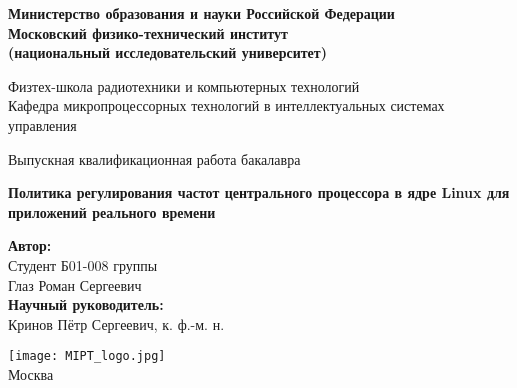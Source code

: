 \begin{center}

    \large\textbf{Министерство образования и науки Российской Федерации         \\
    Московский физико-технический институт                                      \\
    (национальный исследовательский университет)}                               \\
    \vspace{1cm}

    Физтех-школа радиотехники и компьютерных технологий                         \\

    Кафедра микропроцессорных технологий в интеллектуальных системах управления \\

    \vspace{3em}

    Выпускная квалификационная работа бакалавра
\end{center}

\begin{center}
    \vspace{\fill}
    \textbf{\LARGE{Политика регулирования частот центрального процессора в ядре Linux для приложений реального времени}}
    \vspace{\fill}
\end{center}

\begin{flushright}
    \textbf{Автор:}                     \\
    Студент Б01-008 группы              \\
    Глаз Роман Сергеевич                \\
    \vspace{2em}
    \textbf{Научный руководитель:}      \\
    Кринов Пётр Сергеевич, к. ф.-м. н.  \\
\end{flushright}

\vspace{7em}

\begin{center}
    \texttt{[image: MIPT\_logo.jpg]}\\
    Москва \the\year{}
\end{center}

\thispagestyle{empty}
\newpage
\setcounter{page}{2}
\fancyfoot[c]{\thepage}

\fancyhead[L]{}
\fancyhead[R]{}
\fancyhead[C]{}
\renewcommand{\headrulewidth}{0pt}
